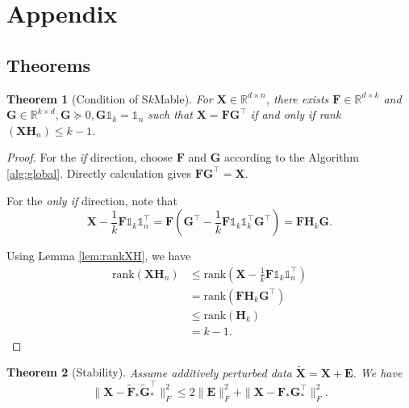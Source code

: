 \documentclass[journal]{IEEEtran}
\begin{document}
\appendix
\section{Appendix}
\subsection{Theorems}
\newtheorem{thmm}{\bf Theorem}
\setcounter{thmm}{1}
\begin{thmm}[Condition of S$k$Mable]
	For $\mathbf{X}\in\mathbb{R}^{d\times n}$, there exists $\mathbf{F}\in\mathbb{R}^{d\times k}$ and $\mathbf{G}\in\mathbb{R}^{k\times d}, \mathbf{G}\succeq 0,\mathbf{G}\mathbb{1}_k = \mathbb{1}_n$ such that $\mathbf{X}=\mathbf{FG}^\top$ if and only if rank$(\mathbf{X}\mathbf{H}_n) \leq k-1$.
\end{thmm}
\begin{proof}
	For the {\em if} direction, choose $\textbf{F}$ and $\textbf{G}$ according to the Algorithm \ref{alg:global}. 
	Directly calculation gives $\textbf{FG}^\top = \textbf{X}$.
	
	For the {\em only if} direction, note that
	\[
	\textbf{X} - \frac{1}{k}\textbf{F}\mathbb{1}_k\mathbb{1}_n^\top = \textbf{F}\left(\textbf{G}^\top - \frac{1}{k}\textbf{F}\mathbb{1}_k\mathbb{1}_k^\top\textbf{G}^\top\right) = \textbf{FH}_k\textbf{G}.
	\]
	
	Using Lemma \ref{lem:rankXH}, we have
	\[
	\begin{aligned}
	\text{rank}(\textbf{XH}_n) &\leq \text{rank}\left(\textbf{X} - \frac{1}{k}\textbf{F}\mathbb{1}_k\mathbb{1}_n^\top\right)\\
	&= \text{rank}\left(\textbf{F}\textbf{H}_k\textbf{G}^\top\right)\\
	&\leq \text{rank}(\textbf{H}_k) \\
	&= k-1.
	\end{aligned}
	\]
\end{proof}
\begin{thmm}[Stability]
	Assume additively perturbed data $\widetilde{\mathbf{X}} = \mathbf{X} + \mathbf{E}$. 
	We have
	\[
	\|\mathbf{X} - \widetilde{\mathbf{F}}_*\widetilde{\mathbf{G}}_*^\top \|_F^2 \leq  2\|\mathbf{E}\|_F^2 + \|\mathbf{X} - \mathbf{F}_*\mathbf{G}_*^\top \|_F^2.
	\]
\end{thmm}
\end{document}
